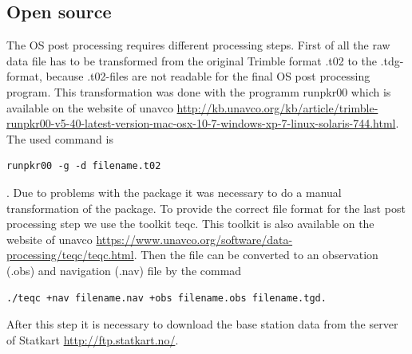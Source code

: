 \subsection{Open source}
The OS post processing requires different processing steps.
First of all the raw data file has to be transformed from the original Trimble format .t02 to the .tdg-format, because .t02-files are not readable for the final OS post processing program.
This transformation was done with the programm runpkr00 which is available on the website of unavco \url{http://kb.unavco.org/kb/article/trimble-runpkr00-v5-40-latest-version-mac-osx-10-7-windows-xp-7-linux-solaris-744.html}.
The used command is 
\begin{verbatim} 
runpkr00 -g -d filename.t02 
\end{verbatim}.
Due to problems with the package it was necessary to do a manual transformation of the package.
To provide the correct file format for the last post processing step we use the toolkit teqc.
This toolkit is also available on the website of unavco \url{https://www.unavco.org/software/data-processing/teqc/teqc.html}.
Then the file can be converted to an observation (.obs) and navigation (.nav) file by the commad
\begin{verbatim}
./teqc +nav filename.nav +obs filename.obs filename.tgd.
\end{verbatim} 
After this step it is necessary to download the base station data from the server of Statkart \url{http://ftp.statkart.no/}.
\medskip

